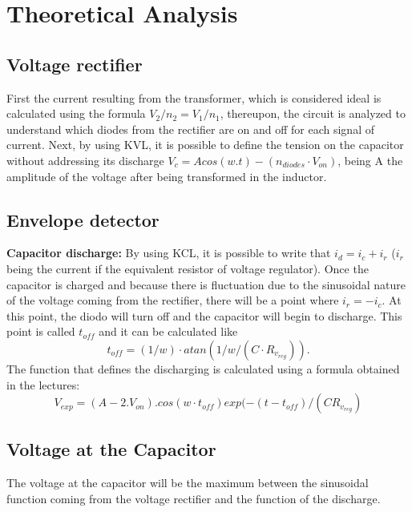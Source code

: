 \section{Theoretical Analysis}
\label{sec:theoretical analysis}

\subsection{Voltage rectifier}
First the current resulting from the transformer, which is considered ideal is calculated using the formula $V_2/n_2=V_1/n_1 $, thereupon, the circuit is analyzed to understand which diodes from the rectifier are on and off for each signal of current. Next, by using KVL, it is possible to define the tension on the capacitor without addressing its discharge $V_c=A cos(w.t)-(n_{diodes} \cdot V_{on}) $, being A the amplitude of the voltage after being transformed in the inductor. 

\subsection{Envelope detector}

\textbf{Capacitor discharge:}
By using KCL, it is possible to write that $i_d = i_c + i_r$ ($i_r$ being the current if the equivalent resistor of voltage regulator).
Once the capacitor is charged and because there is fluctuation due to the sinusoidal nature of the voltage coming from the rectifier, there will be a point where $i_r = -i_c$. At this point, the diodo will turn off and the capacitor will begin to discharge. This point is called $t_{off}$ and it can be calculated like $$ t_{off}=(1/w)\cdot atan(1/w/(C  \cdot  R_{v_{reg}})).$$The function that defines the discharging is calculated using a formula obtained in the lectures: $$ V_{exp}=(A-2.V_{on}).cos(w \cdot t_{off})exp(-(t-t_{off})/(CR_{v_{reg}})$$




\subsection{Voltage at the Capacitor}

The voltage at the capacitor will be the maximum between the sinusoidal function coming from the voltage rectifier and the function of the discharge.

